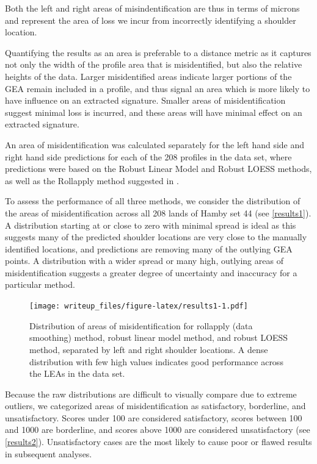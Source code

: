\documentclass[12pt]{article}
\begin{document}
Both the left and right areas of misindentification are thus in terms of
microns and represent the area of loss we incur from incorrectly
identifying a shoulder location.

Quantifying the results as an area is preferable to a distance metric as
it captures not only the width of the profile area that is
misidentified, but also the relative heights of the data. Larger
misidentified areas indicate larger portions of the GEA remain included
in a profile, and thus signal an area which is more likely to have
influence on an extracted signature. Smaller areas of misidentification
suggest minimal loss is incurred, and these areas will have minimal
effect on an extracted signature.

An area of misidentification was calculated separately for the left hand
side and right hand side predictions for each of the 208 profiles in the
data set, where predictions were based on the Robust Linear Model and
Robust LOESS methods, as well as the Rollapply method suggested in
\citet{Hare1}.

To assess the performance of all three methods, we consider the
distribution of the areas of misidentification across all 208 lands of
Hamby set 44 (see \autoref{results1}). A distribution starting at or
close to zero with minimal spread is ideal as this suggests many of the
predicted shoulder locations are very close to the manually identified
locations, and predictions are removing many of the outlying GEA points.
A distribution with a wider spread or many high, outlying areas of
misidentification suggests a greater degree of uncertainty and
inaccuracy for a particular method.

\begin{figure}
\centering
\texttt{[image: writeup\_files/figure-latex/results1-1.pdf]}
\caption{\label{results1}Distribution of areas of misidentification for
rollapply (data smoothing) method, robust linear model method, and
robust LOESS method, separated by left and right shoulder locations. A
dense distribution with few high values indicates good performance
across the LEAs in the data set.}
\end{figure}

Because the raw distributions are difficult to visually compare due to
extreme outliers, we categorized areas of misidentification as
satisfactory, borderline, and unsatisfactory. Scores under 100 are
considered satisfactory, scores between 100 and 1000 are borderline, and
scores above 1000 are considered unsatisfactory (see
\autoref{results2}). Unsatisfactory cases are the most likely to cause
poor or flawed results in subsequent analyses.
\end{document}
